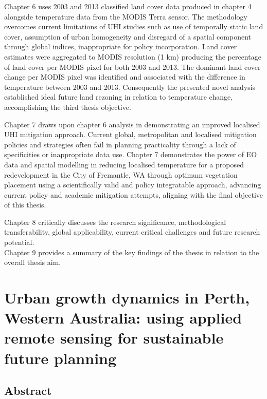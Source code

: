 \documentclass[]{book}
\begin{document}
Chapter 6 uses 2003 and 2013 classified land cover data produced in
chapter 4 alongside temperature data from the MODIS Terra sensor. The
methodology overcomes current limitations of UHI studies such as use of
temporally static land cover, assumption of urban homogeneity and
disregard of a spatial component through global indices, inappropriate
for policy incorporation. Land cover estimates were aggregated to MODIS
resolution (1 km) producing the percentage of land cover per MODIS pixel
for both 2003 and 2013. The dominant land cover change per MODIS pixel
was identified and associated with the difference in temperature between
2003 and 2013. Consequently the presented novel analysis established
ideal future land rezoning in relation to temperature change,
accomplishing the third thesis objective.

Chapter 7 draws upon chapter 6 analysis in demonstrating an improved
localised UHI mitigation approach. Current global, metropolitan and
localised mitigation policies and strategies often fail in planning
practicality through a lack of specificities or inappropriate data use.
Chapter 7 demonstrates the power of EO data and spatial modelling in
reducing localised temperature for a proposed redevelopment in the City
of Fremantle, WA through optimum vegetation placement using a
scientifically valid and policy integratable approach, advancing current
policy and academic mitigation attempts, aligning with the final
objective of this thesis.

Chapter 8 critically discusses the research significance, methodological
transferability, global applicability, current critical challenges and
future research potential.\\
Chapter 9 provides a summary of the key findings of the thesis in
relation to the overall thesis aim.

\chapter{Urban growth dynamics in Perth, Western Australia: using
applied remote sensing for sustainable future
planning}\label{urban-growth-dynamics-in-perth-western-australia-using-applied-remote-sensing-for-sustainable-future-planning}

\section{Abstract}\label{abstract-1}
\end{document}

